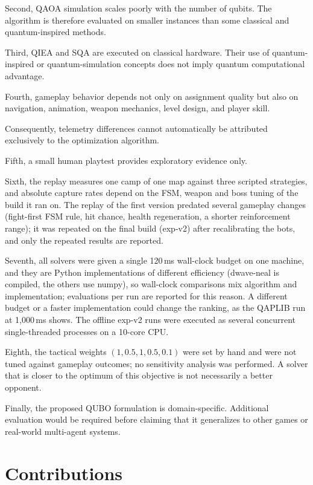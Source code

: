 \documentclass[12pt, a4paper]{article}
\begin{document}
Second, QAOA simulation scales poorly with the number of qubits. The algorithm is therefore evaluated on smaller instances than some classical and quantum-inspired methods.

Third, QIEA and SQA are executed on classical hardware. Their use of quantum-inspired or quantum-simulation concepts does not imply quantum computational advantage.

Fourth, gameplay behavior depends not only on assignment quality but also on navigation, animation, weapon mechanics, level design, and player skill.

Consequently, telemetry differences cannot automatically be attributed exclusively to the optimization algorithm.

Fifth, a small human playtest provides exploratory evidence only.

Sixth, the replay measures one camp of one map against three scripted strategies, and absolute capture rates depend on the FSM, weapon and boss tuning of the build it ran on. The replay of the first version predated several gameplay changes (fight-first FSM rule, hit chance, health regeneration, a shorter reinforcement range); it was repeated on the final build (exp-v2) after recalibrating the bots, and only the repeated results are reported.

Seventh, all solvers were given a single 120\,ms wall-clock budget on one machine, and they are Python implementations of different efficiency (dwave-neal is compiled, the others use numpy), so wall-clock comparisons mix algorithm and implementation; evaluations per run are reported for this reason. A different budget or a faster implementation could change the ranking, as the QAPLIB run at 1{,}000\,ms shows. The offline exp-v2 runs were executed as several concurrent single-threaded processes on a 10-core CPU.

Eighth, the tactical weights $(1, 0.5, 1, 0.5, 0.1)$ were set by hand and were not tuned against gameplay outcomes; no sensitivity analysis was performed. A solver that is closer to the optimum of this objective is not necessarily a better opponent.

Finally, the proposed QUBO formulation is domain-specific. Additional evaluation would be required before claiming that it generalizes to other games or real-world multi-agent systems.

\section*{Contributions}
\end{document}
